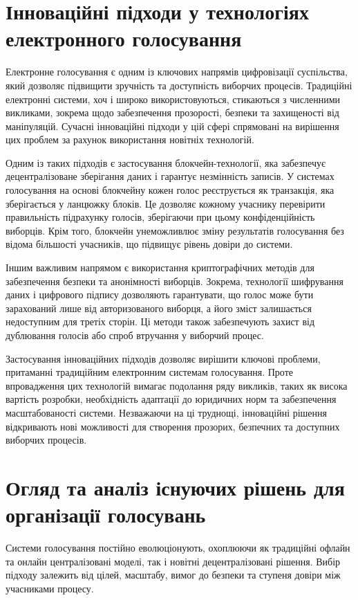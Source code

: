 \documentclass[14pt]{extreport}
\begin{document}
  \section{Інноваційні підходи у технологіях електронного голосування}
  
    Електронне голосування є одним із ключових напрямів цифровізації суспільства, який дозволяє підвищити зручність та доступність виборчих процесів. Традиційні електронні системи, хоч і широко використовуються, стикаються з численними викликами, зокрема щодо забезпечення прозорості, безпеки та захищеності від маніпуляцій. Сучасні інноваційні підходи у цій сфері спрямовані на вирішення цих проблем за рахунок використання новітніх технологій.

  Одним із таких підходів є застосування блокчейн-технології, яка забезпечує децентралізоване зберігання даних і гарантує незмінність записів. У системах голосування на основі блокчейну кожен голос реєструється як транзакція, яка зберігається у ланцюжку блоків. Це дозволяє кожному учаснику перевірити правильність підрахунку голосів, зберігаючи при цьому конфіденційність виборців. Крім того, блокчейн унеможливлює зміну результатів голосування без відома більшості учасників, що підвищує рівень довіри до системи.

  Іншим важливим напрямом є використання криптографічних методів для забезпечення безпеки та анонімності виборців. Зокрема, технології шифрування даних і цифрового підпису дозволяють гарантувати, що голос може бути зарахований лише від авторизованого виборця, а його зміст залишається недоступним для третіх сторін. Ці методи також забезпечують захист від дублювання голосів або спроб втручання у виборчий процес.

  Застосування інноваційних підходів дозволяє вирішити ключові проблеми, притаманні традиційним електронним системам голосування. Проте впровадження цих технологій вимагає подолання ряду викликів, таких як висока вартість розробки, необхідність адаптації до юридичних норм та забезпечення масштабованості системи. Незважаючи на ці труднощі, інноваційні рішення відкривають нові можливості для створення прозорих, безпечних та доступних виборчих процесів.
  
  \section{Огляд та аналіз існуючих рішень для організації голосувань}

  Системи голосування постійно еволюціонують, охоплюючи як традиційні офлайн та онлайн централізовані моделі, так і новітні децентралізовані рішення. Вибір підходу залежить від цілей, масштабу, вимог до безпеки та ступеня довіри між учасниками процесу.
\end{document}
